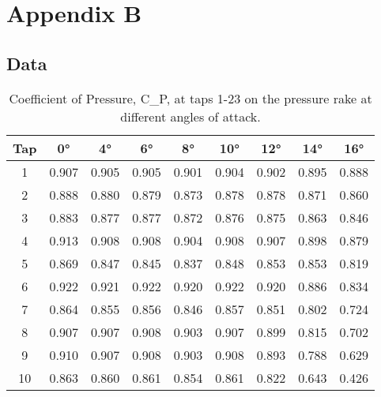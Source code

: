\chapter{Appendix B}
\section{Data}\label{sec:data}

 \begin{table}[htpb]
    \caption{Coefficient of Pressure, \gls{C_P}, at taps 1-23 on the pressure rake at different angles of attack.}
    \label{tab:C_P_data_1}
    \centering
    \begin{tabular}{ccccccccc}
        \toprule
        Tap & \num{0}\unit{\degree} & \num{4}\unit{\degree} & \num{6}\unit{\degree} & \num{8}\unit{\degree} & \num{10}\unit{\degree} & \num{12}\unit{\degree} & \num{14}\unit{\degree} & \num{16}\unit{\degree}\\
        \midrule
        \num{1} & \num{0.907} & \num{0.905} & \num{0.905} & \num{0.901} & \num{0.904} & \num{0.902} & \num{0.895} & \num{0.888} \\
        \num{2} & \num{0.888} & \num{0.880} & \num{0.879} & \num{0.873} & \num{0.878} & \num{0.878} & \num{0.871} & \num{0.860} \\
        \num{3} & \num{0.883} & \num{0.877} & \num{0.877} & \num{0.872} & \num{0.876} & \num{0.875} & \num{0.863} & \num{0.846} \\
        \num{4} & \num{0.913} & \num{0.908} & \num{0.908} & \num{0.904} & \num{0.908} & \num{0.907} & \num{0.898} & \num{0.879} \\
        \num{5} & \num{0.869} & \num{0.847} & \num{0.845} & \num{0.837} & \num{0.848} & \num{0.853} & \num{0.853} & \num{0.819} \\
        \num{6} & \num{0.922} & \num{0.921} & \num{0.922} & \num{0.920} & \num{0.922} & \num{0.920} & \num{0.886} & \num{0.834} \\
        \num{7} & \num{0.864} & \num{0.855} & \num{0.856} & \num{0.846} & \num{0.857} & \num{0.851} & \num{0.802} & \num{0.724} \\
        \num{8} & \num{0.907} & \num{0.907} & \num{0.908} & \num{0.903} & \num{0.907} & \num{0.899} & \num{0.815} & \num{0.702} \\
        \num{9} & \num{0.910} & \num{0.907} & \num{0.908} & \num{0.903} & \num{0.908} & \num{0.893} & \num{0.788} & \num{0.629} \\
        \num{10} & \num{0.863} & \num{0.860} & \num{0.861} & \num{0.854} & \num{0.861} & \num{0.822} & \num{0.643} & \num{0.426} \\

\end{tabular}
\end{table}
